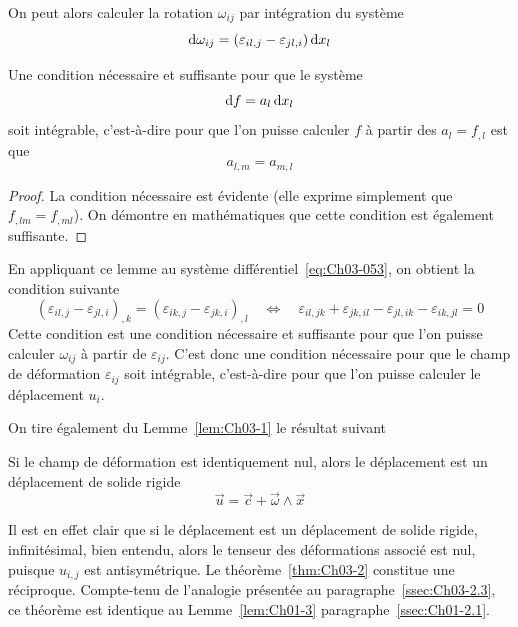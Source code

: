 On peut alors calculer la rotation $\omega_{ij}$ par intégration du système
\begin{equation}
    \mathop{\mathrm{{}d}}\mathopen{} \omega_{ij} = \left( \varepsilon_{il,j} - \varepsilon_{jl,i} \right) \mathop{\mathrm{{}d}}\mathopen{} x_l
    \label{eq:Ch03-053}
\end{equation}
\begin{lem} \label{lem:Ch03-2}
    Une condition nécessaire et suffisante pour que le système 
    \begin{equation}
        \mathop{\mathrm{{}d}}\mathopen{} f = a_l \mathop{\mathrm{{}d}}\mathopen{} x_l
        \label{eq:Ch03-054}
    \end{equation}
    soit intégrable, c'est-à-dire pour que l'on puisse calculer $f$ à partir des $a_l = f_{,l}$ est que 
    \begin{equation}
        a_{l,m} = a_{m,l}
        \label{eq:Ch03-055}
    \end{equation}
\end{lem}
\begin{proof}
    La condition nécessaire est évidente (elle exprime simplement que $f_{,lm} = f_{,ml}$).
    On démontre en mathématiques que cette condition est également suffisante.
\end{proof}

En appliquant ce lemme au système différentiel~\eqref{eq:Ch03-053}, on obtient la condition suivante
\begin{equation}
        \left( \varepsilon_{il,j} -\varepsilon_{jl,i} \right)_{,k} = \left( \varepsilon_{ik,j} - \varepsilon_{jk,i} \right)_{,l} \quad\Leftrightarrow\quad
        \varepsilon_{il,jk} + \varepsilon_{jk,il} - \varepsilon_{jl,ik} - \varepsilon_{ik,jl} = 0
    \label{eq:Ch03-056}
\end{equation}
Cette condition est une condition nécessaire et suffisante pour que l'on puisse calculer $\omega_{ij}$ à partir de $\varepsilon_{ij}$.
C'est donc une condition nécessaire pour que le champ de déformation $\varepsilon_{ij}$ soit intégrable, c'est-à-dire pour que l'on puisse calculer le déplacement $u_i$.

On tire également du Lemme~\ref{lem:Ch03-1} le résultat suivant
\begin{thm} \label{thm:Ch03-2}
    Si le champ de déformation est identiquement nul, alors le déplacement est un déplacement de solide rigide 
    \begin{equation}
        \vec{u} = \vec{c} + \vec{\omega} \wedge \vec{x}
        \label{eq:Ch03-057}
    \end{equation}
\end{thm}
Il est en effet clair que si le déplacement est un déplacement de solide rigide, infinitésimal, bien entendu, alors le tenseur des déformations associé est nul, puisque $u_{i,j}$ est antisymétrique.
Le théorème~\ref{thm:Ch03-2} constitue une réciproque.
Compte-tenu de l'analogie présentée au paragraphe~\ref{ssec:Ch03-2.3}, ce théorème est identique au Lemme~\ref{lem:Ch01-3} paragraphe~\ref{ssec:Ch01-2.1}.

